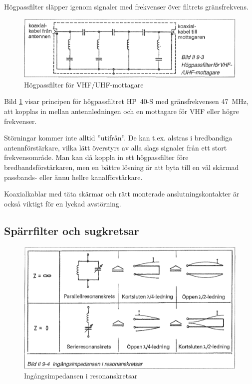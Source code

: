 Högpassfilter släpper igenom signaler med frekvenser över filtrets
gränsfrekvens.

\begin{figure}
  \includegraphics[width=\textwidth]{images/bild_2_9-03}
  \caption{Högpassfilter för VHF/UHF-mottagare}
  \label{fig:bildII9-3}
\end{figure}

Bild \ref{fig:bildII9-3} visar principen för högpassfiltret HP~40-S med
gränsfrekvensen 47~MHz, att kopplas in mellan antennledningen och en
mottagare för VHF eller högre frekvenser.

Störningar kommer inte alltid ''utifrån''. De kan t.ex. alstras i bredbandiga
antennförstärkare, vilka lätt överstyrs av alla slags signaler från ett stort
frekvensområde. Man kan då koppla in ett högpassfilter före
bredbandsförstärkaren, men en bättre lösning är att byta till en väl skärmad
passbands- eller ännu hellre kanalförstärkare.

Koaxialkablar med täta skärmar och rätt monterade anslutningskontakter
är också viktigt för en lyckad avstörning.

\subsection{Spärrfilter och sugkretsar}

\begin{figure}
  \includegraphics[width=\textwidth]{images/bild_2_9-04}
  \caption{Ingångsimpedansen i resonanskretsar}
  \label{fig:bildII9-4}
\end{figure}

